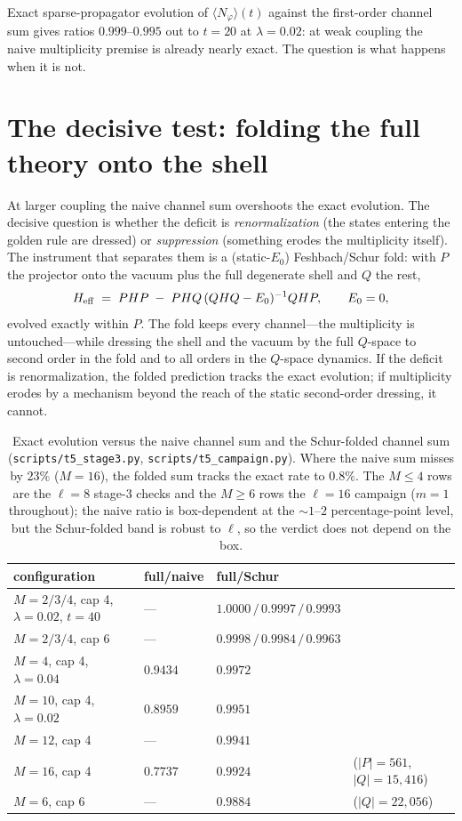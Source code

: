\documentclass[11pt]{article}
\begin{document}
Exact sparse-propagator evolution of $\langle N_\varphi\rangle(t)$ against
the first-order channel sum gives ratios $0.999$--$0.995$ out to
$t=20$ at $\lambda=0.02$: at weak coupling the naive
multiplicity premise is already nearly exact. The question is
what happens when it is not.

\section{The decisive test: folding the full theory onto the
shell}
\label{sec:fold}

At larger coupling the naive channel sum overshoots the exact
evolution. The decisive question is whether the deficit is
\emph{renormalization} (the states entering the golden rule are
dressed) or \emph{suppression} (something erodes the
multiplicity itself). The instrument that separates them is a
(static-$E_0$) Feshbach/Schur fold: with $P$ the projector onto the vacuum
plus the full degenerate shell and $Q$ the rest,
\[
H_{\rm eff}\;=\;PHP\;-\;PHQ\,(QHQ-E_0)^{-1}QHP,
\qquad E_0=0,
\]
evolved exactly within $P$. The fold keeps every channel---the
multiplicity is untouched---while dressing the shell and the
vacuum by the full $Q$-space to second order in the fold and to
all orders in the $Q$-space dynamics. If the deficit is
renormalization, the folded prediction tracks the exact
evolution; if multiplicity erodes by a mechanism beyond the reach of the
static second-order dressing, it cannot.

\begin{table}[t]
\centering\small
\begin{tabular}{@{}llll@{}}
\toprule
configuration & full/naive & full/Schur & \\
\midrule
$M=2/3/4$, cap 4, $\lambda=0.02$, $t=40$ & --- &
$1.0000\,/\,0.9997\,/\,0.9993$ & \\
$M=2/3/4$, cap 6 & --- & $0.9998\,/\,0.9984\,/\,0.9963$ & \\
$M=4$, cap 4, $\lambda=0.04$ & $0.9434$ & $0.9972$ & \\
$M=10$, cap 4, $\lambda=0.02$ & $0.8959$ & $0.9951$ & \\
$M=12$, cap 4 & --- & $0.9941$ & \\
$M=16$, cap 4 & $0.7737$ & $0.9924$ &
{\footnotesize($|P|=561$, $|Q|=15{,}416$)}\\
$M=6$, cap 6 & --- & $0.9884$ &
{\footnotesize($|Q|=22{,}056$)}\\
\bottomrule
\end{tabular}
\caption{Exact evolution versus the naive channel sum and the
Schur-folded channel sum
(\texttt{scripts/t5\_stage3.py}, \texttt{scripts/t5\_campaign.py}). Where the
naive sum misses by $23\%$ ($M=16$), the folded sum tracks the
exact rate to $0.8\%$. The $M\le4$ rows are the $\ell=8$ stage-3
checks and the $M\ge6$ rows the $\ell=16$ campaign ($m=1$ throughout);
the naive ratio is box-dependent at the $\sim1$--$2$ percentage-point
level, but the Schur-folded band is robust to $\ell$, so the verdict
does not depend on the box.}
\label{tab:verdict}
\end{table}
\end{document}
